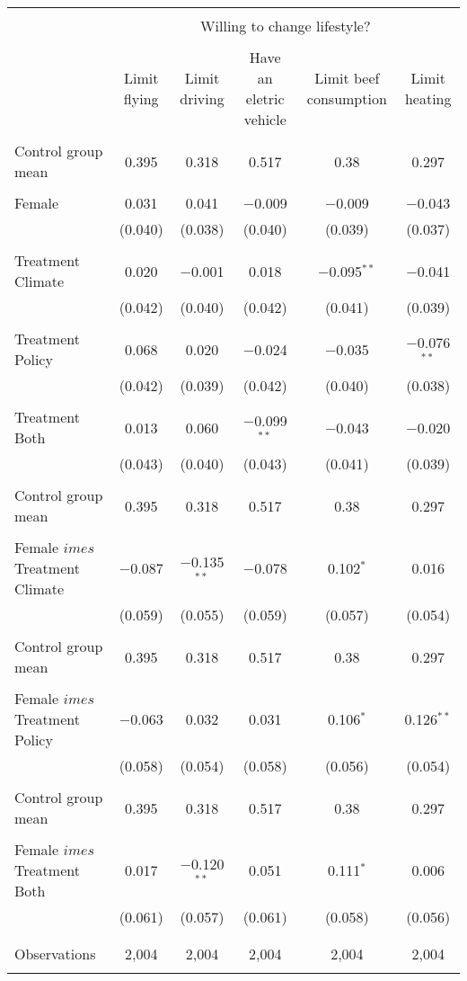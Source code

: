 
\begin{tabular}{@{\extracolsep{5pt}}lccccc} 
\\[-1.8ex]\hline 
\hline \\[-1.8ex] 
 & \multicolumn{5}{c}{Willing to change lifestyle?} \\ 
\cline{2-6} 
\\[-1.8ex] & Limit flying & Limit driving & Have an eletric vehicle & Limit beef consumption & Limit heating \\ 
\hline \\[-1.8ex] 
 Control group mean & 0.395 & 0.318 & 0.517 & 0.38 & 0.297  \\ \hline \\[-1.8ex] Female & 0.031 & 0.041 & $-$0.009 & $-$0.009 & $-$0.043 \\ 
  & (0.040) & (0.038) & (0.040) & (0.039) & (0.037) \\ 
  & & & & & \\ 
 Treatment Climate & 0.020 & $-$0.001 & 0.018 & $-$0.095$^{**}$ & $-$0.041 \\ 
  & (0.042) & (0.040) & (0.042) & (0.041) & (0.039) \\ 
  & & & & & \\ 
 Treatment Policy & 0.068 & 0.020 & $-$0.024 & $-$0.035 & $-$0.076$^{**}$ \\ 
  & (0.042) & (0.039) & (0.042) & (0.040) & (0.038) \\ 
  & & & & & \\ 
 Treatment Both & 0.013 & 0.060 & $-$0.099$^{**}$ & $-$0.043 & $-$0.020 \\ 
  & (0.043) & (0.040) & (0.043) & (0.041) & (0.039) \\ 
  & & & & & \\ 
 Control group mean & 0.395 & 0.318 & 0.517 & 0.38 & 0.297  \\ \hline \\[-1.8ex] Female $	imes$ Treatment Climate & $-$0.087 & $-$0.135$^{**}$ & $-$0.078 & 0.102$^{*}$ & 0.016 \\ 
  & (0.059) & (0.055) & (0.059) & (0.057) & (0.054) \\ 
  & & & & & \\ 
 Control group mean & 0.395 & 0.318 & 0.517 & 0.38 & 0.297  \\ \hline \\[-1.8ex] Female $	imes$ Treatment Policy & $-$0.063 & 0.032 & 0.031 & 0.106$^{*}$ & 0.126$^{**}$ \\ 
  & (0.058) & (0.054) & (0.058) & (0.056) & (0.054) \\ 
  & & & & & \\ 
 Control group mean & 0.395 & 0.318 & 0.517 & 0.38 & 0.297  \\ \hline \\[-1.8ex] Female $	imes$ Treatment Both & 0.017 & $-$0.120$^{**}$ & 0.051 & 0.111$^{*}$ & 0.006 \\ 
  & (0.061) & (0.057) & (0.061) & (0.058) & (0.056) \\ 
  & & & & & \\ 
\hline \\[-1.8ex] 

Observations & 2,004 & 2,004 & 2,004 & 2,004 & 2,004 \\ 
\hline 
\hline \\[-1.8ex] 
\end{tabular} 
